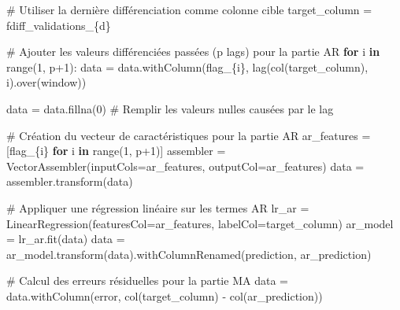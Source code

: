 \documentclass[
  letterpaper,
  DIV=11,
  numbers=noendperiod]{scrartcl}
\newenvironment{Shaded}{\begin{snugshade}}{\end{snugshade}}
\newcommand{\BuiltInTok}[1]{\textcolor[rgb]{0.00,0.23,0.31}{#1}}
\newcommand{\CommentTok}[1]{\textcolor[rgb]{0.37,0.37,0.37}{#1}}
\newcommand{\ControlFlowTok}[1]{\textcolor[rgb]{0.00,0.23,0.31}{\textbf{#1}}}
\newcommand{\DecValTok}[1]{\textcolor[rgb]{0.68,0.00,0.00}{#1}}
\newcommand{\KeywordTok}[1]{\textcolor[rgb]{0.00,0.23,0.31}{\textbf{#1}}}
\newcommand{\NormalTok}[1]{\textcolor[rgb]{0.00,0.23,0.31}{#1}}
\newcommand{\OperatorTok}[1]{\textcolor[rgb]{0.37,0.37,0.37}{#1}}
\newcommand{\SpecialCharTok}[1]{\textcolor[rgb]{0.37,0.37,0.37}{#1}}
\newcommand{\SpecialStringTok}[1]{\textcolor[rgb]{0.13,0.47,0.30}{#1}}
\newcommand{\StringTok}[1]{\textcolor[rgb]{0.13,0.47,0.30}{#1}}
\begin{document}
\begin{Shaded}
\begin{Highlighting}[]
    \CommentTok{\# Utiliser la dernière différenciation comme colonne cible}
\NormalTok{    target\_column }\OperatorTok{=} \SpecialStringTok{f\textquotesingle{}diff\_validations\_}\SpecialCharTok{\{}\NormalTok{d}\SpecialCharTok{\}}\SpecialStringTok{\textquotesingle{}}

    \CommentTok{\# Ajouter les valeurs différenciées passées (p lags) pour la partie AR}
    \ControlFlowTok{for}\NormalTok{ i }\KeywordTok{in} \BuiltInTok{range}\NormalTok{(}\DecValTok{1}\NormalTok{, p}\OperatorTok{+}\DecValTok{1}\NormalTok{):}
\NormalTok{        data }\OperatorTok{=}\NormalTok{ data.withColumn(}\SpecialStringTok{f\textquotesingle{}lag\_}\SpecialCharTok{\{}\NormalTok{i}\SpecialCharTok{\}}\SpecialStringTok{\textquotesingle{}}\NormalTok{, lag(col(target\_column), i).over(window))}
    
\NormalTok{    data }\OperatorTok{=}\NormalTok{ data.fillna(}\DecValTok{0}\NormalTok{)  }\CommentTok{\# Remplir les valeurs nulles causées par le lag}
    
    \CommentTok{\# Création du vecteur de caractéristiques pour la partie AR}
\NormalTok{    ar\_features }\OperatorTok{=}\NormalTok{ [}\SpecialStringTok{f\textquotesingle{}lag\_}\SpecialCharTok{\{}\NormalTok{i}\SpecialCharTok{\}}\SpecialStringTok{\textquotesingle{}} \ControlFlowTok{for}\NormalTok{ i }\KeywordTok{in} \BuiltInTok{range}\NormalTok{(}\DecValTok{1}\NormalTok{, p}\OperatorTok{+}\DecValTok{1}\NormalTok{)]}
\NormalTok{    assembler }\OperatorTok{=}\NormalTok{ VectorAssembler(inputCols}\OperatorTok{=}\NormalTok{ar\_features, outputCol}\OperatorTok{=}\StringTok{\textquotesingle{}ar\_features\textquotesingle{}}\NormalTok{)}
\NormalTok{    data }\OperatorTok{=}\NormalTok{ assembler.transform(data)}
    
    \CommentTok{\# Appliquer une régression linéaire sur les termes AR}
\NormalTok{    lr\_ar }\OperatorTok{=}\NormalTok{ LinearRegression(featuresCol}\OperatorTok{=}\StringTok{\textquotesingle{}ar\_features\textquotesingle{}}\NormalTok{, labelCol}\OperatorTok{=}\NormalTok{target\_column)}
\NormalTok{    ar\_model }\OperatorTok{=}\NormalTok{ lr\_ar.fit(data)}
\NormalTok{    data }\OperatorTok{=}\NormalTok{ ar\_model.transform(data).withColumnRenamed(}\StringTok{\textquotesingle{}prediction\textquotesingle{}}\NormalTok{, }\StringTok{\textquotesingle{}ar\_prediction\textquotesingle{}}\NormalTok{)}
    
    \CommentTok{\# Calcul des erreurs résiduelles pour la partie MA}
\NormalTok{    data }\OperatorTok{=}\NormalTok{ data.withColumn(}\StringTok{\textquotesingle{}error\textquotesingle{}}\NormalTok{, col(target\_column) }\OperatorTok{{-}}\NormalTok{ col(}\StringTok{\textquotesingle{}ar\_prediction\textquotesingle{}}\NormalTok{))}
    

\end{Highlighting}
\end{Shaded}
\end{document}
